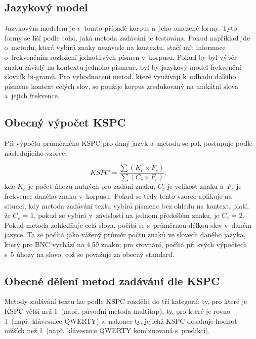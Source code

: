 \documentclass[a4paper,11pt,openany]{book} %
\begin{document}
\subsection{Jazykový model}

Jazykovým modelem je v~tomto případě korpus a~jeho omezené formy. Tyto formy se liší podle toho, jaká metoda zadávání je testována. Pokud například jde o~metodu, která vybírá znaky nezávisle na kontextu, stačí mít informace o~frekvenčním rozložení jednotlivých písmen v~korpusu. Pokud by byl výběr znaku závislý na kontextu jednoho písmene, byl by jazykový model frekvenční slovník bi-gramů. Pro vyhodnocení metod, které využívají k~odhadu dalšího písmene kontext celých slov, se použije korpus zredukovaný na unikátní slova a~jejich frekvence.  \parencite[197]{mackenzie2002kspc} %

\subsection{Obecný výpočet KSPC}

Při výpočtu průměrného KSPC pro daný jazyk a~metodu se pak postupuje podle následujícího vzorce:

\[
	KSPC = \frac{\sum{ (K_c \times F_c) }}{\sum{ (C_c \times F_c) }},
\]
kde $K_c$ je počet úhozů nutných pro zadání znaku, $C_c$ je velikost znaku a~$F_c$ je frekvence daného znaku v~korpusu. Pokud se tedy tento vzorec aplikuje na situaci, kdy metoda zadávání textu vybírá písmeno bez ohledu na kontext, platí, že $C_c$ = 1, pokud se vybírá v~závislosti na jednom předešlém znaku, je $C_c$ = 2. Pokud metoda zohledňuje celá slova, počítá se s~průměrnou délkou slov v~daném jazyce. Ta se počítá jako vážený průměr počtu znaků ve slovech daného jazyka, který pro BNC vychází na 4,59 znaku; pro srovnání, \parencite[2]{arif2009analysis} počítá při svých výpočtech s~5 úhozy na slovo, což se považuje za obecný standard. \parencite[3]{tarvainen2010beginner} %

\subsection{Obecné dělení metod zadávání dle KSPC}

Metody zadávání textu lze podle KSPC rozdělit do tří kategorií: ty, pro které je KSPC větší než 1~(např. původní metoda multitap), ty, pro které je rovno 1~(např. klávesnice QWERTY) a~nakonec ty, jejichž KSPC dosahuje hodnot nižších než 1~(např. klávesnice QWERTY kombinovaná s~predikcí). %
\end{document}
